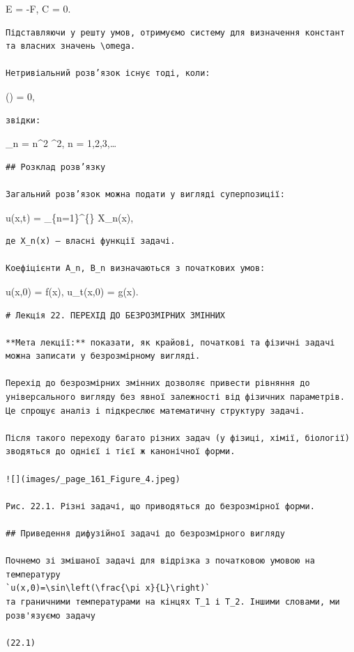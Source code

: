 \documentclass[
  ukrainian,
]{article}
\begin{document}
E = -F, \qquad C = 0.

\begin{verbatim}
Підставляючи у решту умов, отримуємо систему для визначення констант та власних значень \omega.

Нетривіальний розв’язок існує тоді, коли:
\end{verbatim}

\sin(\sqrt{\omega}) = 0,

\begin{verbatim}
звідки:
\end{verbatim}

\omega\_n = n\^{}2 \pi\^{}2, \qquad n = 1,2,3,\dots

\begin{verbatim}
## Розклад розв’язку

Загальний розв’язок можна подати у вигляді суперпозиції:
\end{verbatim}

u(x,t) = \sum\_\{n=1\}\^{}\{\infty\}  X\_n(x),

\begin{verbatim}
де X_n(x) — власні функції задачі.

Коефіцієнти A_n, B_n визначаються з початкових умов:
\end{verbatim}

u(x,0) = f(x), \qquad u\_t(x,0) = g(x).

\begin{verbatim}
# Лекція 22. ПЕРЕХІД ДО БЕЗРОЗМІРНИХ ЗМІННИХ

**Мета лекції:** показати, як крайові, початкові та фізичні задачі можна записати у безрозмірному вигляді.

Перехід до безрозмірних змінних дозволяє привести рівняння до універсального вигляду без явної залежності від фізичних параметрів. Це спрощує аналіз і підкреслює математичну структуру задачі.

Після такого переходу багато різних задач (у фізиці, хімії, біології) зводяться до однієї і тієї ж канонічної форми.

![](images/_page_161_Figure_4.jpeg)

Рис. 22.1. Різні задачі, що приводяться до безрозмірної форми.

## Приведення дифузійної задачі до безрозмірного вигляду

Почнемо зі змішаної задачі для відрізка з початковою умовою на температуру  
`u(x,0)=\sin\left(\frac{\pi x}{L}\right)`  
та граничними температурами на кінцях T_1 і T_2. Іншими словами, ми розв'язуємо задачу

(22.1)
\end{verbatim}
\end{document}
